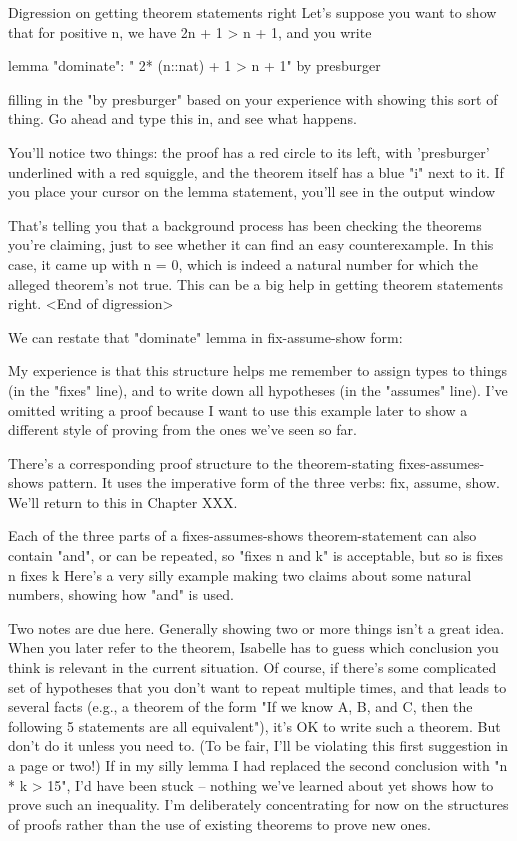 Digression on getting theorem statements right
Let's suppose you want to show that for positive n, we have 2n + 1 > n + 1, and you write

lemma "dominate": " 2* (n::nat) + 1 > n + 1"
  by presburger

filling in the "by presburger" based on your experience with showing this sort of thing. 
Go ahead and type this in, and see what happens. 

You'll notice two things: the proof has a red circle to its left, with  'presburger' underlined with a red squiggle, and the theorem itself has a blue "i" next to it. If you place your cursor on the lemma statement, you'll see in the output window 

That's telling you that a background process has been checking the theorems you're claiming, just to see whether it can find an easy counterexample. In this case, it came up with n = 0, which is indeed a natural number for which the alleged theorem's not true. This can be a big help in getting theorem statements right. <End of digression>

We can restate that "dominate" lemma in fix-assume-show form:

My experience is that this structure helps me remember to assign types to things (in the "fixes" line), and to write down all hypotheses (in the "assumes" line). I've omitted writing a proof because I want to use this example later to show a different style of proving from the ones we've seen so far. 

There's a corresponding proof structure to the theorem-stating fixes-assumes-shows pattern. It uses the imperative form of the three verbs: fix, assume, show. We'll return to this in Chapter XXX.

Each of the three parts of a fixes-assumes-shows theorem-statement can also contain "and", or can be repeated, so "fixes n and k" is acceptable, but so is 
  fixes n 
  fixes k
Here's a very silly example making two claims about some natural numbers, showing how "and" is used. 



Two notes are due here.
Generally showing two or more things isn't a great idea. When you later refer to the theorem, Isabelle has to guess which conclusion you think is relevant in the current situation. Of course, if there's some complicated set of hypotheses that you don't want to repeat multiple times, and that leads to several facts (e.g., a theorem of the form "If we know A, B, and C, then the following 5 statements are all equivalent"), it's OK to write such a theorem. But don't do it unless you need to. (To be fair, I'll be violating this first suggestion in a page or two!)
If in my silly lemma I had replaced the second conclusion with "n * k > 15", I'd have been stuck -- nothing we've learned about yet shows how to prove such an inequality. I'm deliberately concentrating for now on the structures of proofs rather than the use of existing theorems to prove new ones. 

